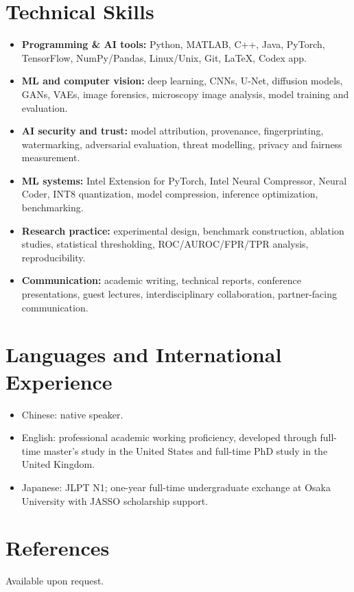 \documentclass[10pt,a4paper]{article}
\begin{document}
\section*{Technical Skills}
\begingroup
\raggedright
\begin{itemize}
    \item \textbf{Programming \& AI tools:} Python, MATLAB, C++, Java, PyTorch, TensorFlow, NumPy/Pandas, Linux/Unix, Git, LaTeX, Codex app.
    \item \textbf{ML and computer vision:} deep learning, CNNs, U-Net, diffusion models, GANs, VAEs, image forensics, microscopy image analysis, model training and evaluation.
    \item \textbf{AI security and trust:} model attribution, provenance, fingerprinting, watermarking, adversarial evaluation, threat modelling, privacy and fairness measurement.
    \item \textbf{ML systems:} Intel Extension for PyTorch, Intel Neural Compressor, Neural Coder, INT8 quantization, model compression, inference optimization, benchmarking.
    \item \textbf{Research practice:} experimental design, benchmark construction, ablation studies, statistical thresholding, ROC/AUROC/FPR/TPR analysis, reproducibility.
    \item \textbf{Communication:} academic writing, technical reports, conference presentations, guest lectures, interdisciplinary collaboration, partner-facing communication.
\end{itemize}
\endgroup

\section*{Languages and International Experience}
\begin{itemize}
    \item Chinese: native speaker.
    \item English: professional academic working proficiency, developed through full-time master's study in the United States and full-time PhD study in the United Kingdom.
    \item Japanese: JLPT N1; one-year full-time undergraduate exchange at Osaka University with JASSO scholarship support.
\end{itemize}

\section*{References}
Available upon request.
\end{document}

